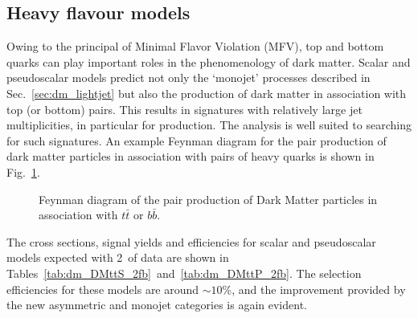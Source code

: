 

\clearpage \subsection{Heavy flavour models} \label{sec:dm_heavyjet}

Owing to the principal of Minimal Flavor Violation (MFV), top and bottom quarks
can play important roles in the phenomenology of dark matter. Scalar and
pseudoscalar models predict not only the `monojet' processes described in
Sec.~\ref{sec:dm_lightjet} but also the production of dark matter in association
with top (or bottom) pairs. This results in signatures with relatively large jet
multiplicities, in particular for \DMtt production. The \alphat analysis is well 
suited to searching for such signatures. An example Feynman diagram for the pair
production of dark matter particles in association with pairs of heavy quarks is
shown in Fig.~\ref{fig:feynman_hf}.


\begin{figure}[h!] \centering
{}
\caption{Feynman diagram of the pair production of Dark Matter particles in
association with $t\bar{t}$ or $b\bar{b}$. \cite{Abercrombie:2015wmb}}
\label{fig:feynman_hf} \end{figure}


The cross sections, signal yields and efficiencies for scalar and pseudoscalar
\DMtt models expected with 2~\ifb of data are shown in
Tables~\ref{tab:dm_DMttS_2fb}~and~\ref{tab:dm_DMttP_2fb}. The selection
efficiencies for these models are around $\sim 10$\%, and the improvement
provided by the new asymmetric and monojet categories is again evident.


